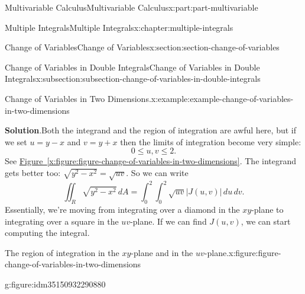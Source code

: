 \documentclass[twoside,10pt,]{tufte-book}
\newcommand{\blocktitlefont}{\relax}
\newcommand{\xreffont}{\relax}
\numberwithin{equation}{part}
\begin{document}
\begin{partptx}{Multivariable Calculus}{}{Multivariable Calculus}{}{}{x:part:part-multivariable}
\begin{chapterptx}{Multiple Integrals}{}{Multiple Integrals}{}{}{x:chapter:multiple-integrals}
\begin{sectionptx}{Change of Variables}{}{Change of Variables}{}{}{x:section:section-change-of-variables}
\begin{subsectionptx}{Change of Variables in Double Integrals}{}{Change of Variables in Double Integrals}{}{}{x:subsection:subsection-change-of-variables-in-double-integrals}
\begin{example}{Change of Variables in Two Dimensions.}{x:example:example-change-of-variables-in-two-dimensions}
\par\smallskip%
\noindent\textbf{\blocktitlefont Solution}.\hypertarget{g:solution:idm35150932296384}{}\quad{}Both the integrand and the region of integration are awful here, but if we set \(u = y - x\) and \(v = y + x\) then the limits of integration become very simple:%
\begin{equation*}
0 \leq u,v \leq 2\text{.}
\end{equation*}
See \hyperref[x:figure:figure-change-of-variables-in-two-dimensions]{Figure~{\xreffont\ref{x:figure:figure-change-of-variables-in-two-dimensions}}}. The integrand gets better too: \(\sqrt{y^{2} - x^{2}} = \sqrt{uv}\). So we can write%
\begin{equation*}
\iint_{R}\sqrt{y^{2} - x^{2}}\,dA = \int_{0}^{2}\int_{0}^{2}\sqrt{uv}|J(u,v)|\,du\,dv\text{.}
\end{equation*}
Essentially, we're moving from integrating over a diamond in the \(xy\)-plane to integrating over a square in the \(uv\)-plane. If we can find \(J(u,v)\), we can start computing the integral.%
\begin{figureptx}{The region of integration in the \(xy\)-plane and in the \(uv\)-plane.}{x:figure:figure-change-of-variables-in-two-dimensions}{}%
\begin{sidebyside}{2}{0}{0}{0}%
\begin{sbspanel}{0.5}%
\begin{subfigureptx}{}{g:figure:idm35150932290880}{}%
\end{subfigureptx}
\end{sbspanel}
\end{sidebyside}
\end{figureptx}
\end{example}
\end{subsectionptx}
\end{sectionptx}
\end{chapterptx}
\end{partptx}
\end{document}
